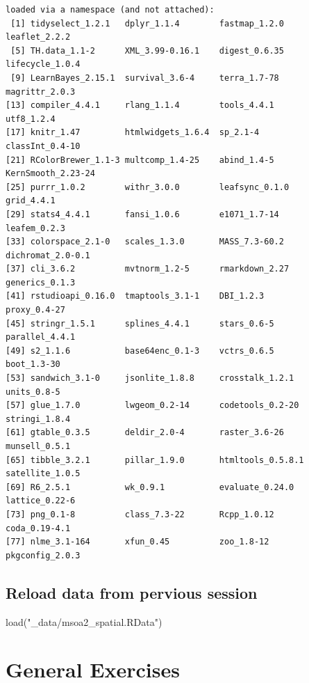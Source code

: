 \documentclass[
  letterpaper,
]{scrbook}
\newenvironment{Shaded}{\begin{snugshade}}{\end{snugshade}}
\newcommand{\FunctionTok}[1]{\textcolor[rgb]{0.28,0.35,0.67}{#1}}
\newcommand{\NormalTok}[1]{\textcolor[rgb]{0.00,0.23,0.31}{#1}}
\newcommand{\StringTok}[1]{\textcolor[rgb]{0.13,0.47,0.30}{#1}}
\begin{document}
\begin{verbatim}
loaded via a namespace (and not attached):
 [1] tidyselect_1.2.1   dplyr_1.1.4        fastmap_1.2.0      leaflet_2.2.2     
 [5] TH.data_1.1-2      XML_3.99-0.16.1    digest_0.6.35      lifecycle_1.0.4   
 [9] LearnBayes_2.15.1  survival_3.6-4     terra_1.7-78       magrittr_2.0.3    
[13] compiler_4.4.1     rlang_1.1.4        tools_4.4.1        utf8_1.2.4        
[17] knitr_1.47         htmlwidgets_1.6.4  sp_2.1-4           classInt_0.4-10   
[21] RColorBrewer_1.1-3 multcomp_1.4-25    abind_1.4-5        KernSmooth_2.23-24
[25] purrr_1.0.2        withr_3.0.0        leafsync_0.1.0     grid_4.4.1        
[29] stats4_4.4.1       fansi_1.0.6        e1071_1.7-14       leafem_0.2.3      
[33] colorspace_2.1-0   scales_1.3.0       MASS_7.3-60.2      dichromat_2.0-0.1 
[37] cli_3.6.2          mvtnorm_1.2-5      rmarkdown_2.27     generics_0.1.3    
[41] rstudioapi_0.16.0  tmaptools_3.1-1    DBI_1.2.3          proxy_0.4-27      
[45] stringr_1.5.1      splines_4.4.1      stars_0.6-5        parallel_4.4.1    
[49] s2_1.1.6           base64enc_0.1-3    vctrs_0.6.5        boot_1.3-30       
[53] sandwich_3.1-0     jsonlite_1.8.8     crosstalk_1.2.1    units_0.8-5       
[57] glue_1.7.0         lwgeom_0.2-14      codetools_0.2-20   stringi_1.8.4     
[61] gtable_0.3.5       deldir_2.0-4       raster_3.6-26      munsell_0.5.1     
[65] tibble_3.2.1       pillar_1.9.0       htmltools_0.5.8.1  satellite_1.0.5   
[69] R6_2.5.1           wk_0.9.1           evaluate_0.24.0    lattice_0.22-6    
[73] png_0.1-8          class_7.3-22       Rcpp_1.0.12        coda_0.19-4.1     
[77] nlme_3.1-164       xfun_0.45          zoo_1.8-12         pkgconfig_2.0.3   
\end{verbatim}

\hypertarget{reload-data-from-pervious-session-2}{%
\subsection*{Reload data from pervious
session}\label{reload-data-from-pervious-session-2}}

\begin{Shaded}
\begin{Highlighting}[]
\FunctionTok{load}\NormalTok{(}\StringTok{"\_data/msoa2\_spatial.RData"}\NormalTok{)}
\end{Highlighting}
\end{Shaded}

\hypertarget{general-exercises}{%
\section{General Exercises}\label{general-exercises}}
\end{document}
